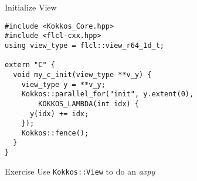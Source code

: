 \begin{frame}[containsverbatim]{Initialize View}
  \begin{verbatim}
#include <Kokkos_Core.hpp>
#include <flcl-cxx.hpp>
using view_type = flcl::view_r64_1d_t;

extern "C" {
  void my_c_init(view_type **v_y) {
    view_type y = **v_y;
    Kokkos::parallel_for("init", y.extent(0), 
        KOKKOS_LAMBDA(int idx) {
      y(idx) += idx;
    });
    Kokkos::fence();
  }
}
  \end{verbatim}
\end{frame}

\begin{frame}{Exercise}
  Use \texttt{Kokkos::View} to do an \emph{axpy}
\end{frame}


